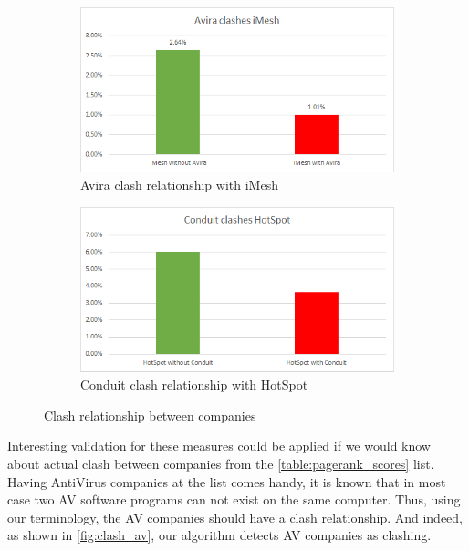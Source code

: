 \documentclass[11pt,oneside]{book}
\begin{document}
\begin{figure}[h]
\centering
\begin{subfigure}[b]{0.49\textwidth}
	\centering
\includegraphics[scale=0.49]{figures/clashAviraImesh.png}
\caption{Avira clash relationship with iMesh}
\label{fig:avira_clash_imesh}
\end{subfigure}
\begin{subfigure}[b]{0.49\textwidth}
	\centering
\includegraphics[scale=0.49]{figures/clashConduitHotSpot.png}
\caption{Conduit clash relationship with HotSpot}
\label{fig:conduit_clash_hotspot}
\end{subfigure}
\caption{Clash relationship between companies}
	\label{fig:clash_pagerank}
\end{figure}

Interesting validation for these measures could be applied if we would know about actual clash between companies from the \autoref{table:pagerank_scores} list. Having AntiVirus companies at the list comes handy, it is known that in most case two AV software programs can not exist on the same computer. Thus, using our terminology, the AV companies should have a clash relationship. And indeed, as shown in \autoref{fig:clash_av}, our algorithm detects AV companies as clashing.
\end{document}

